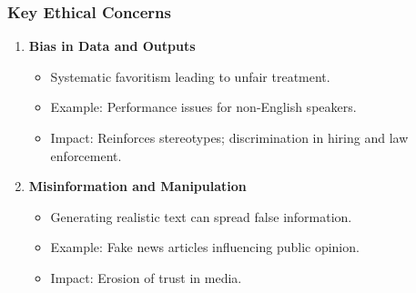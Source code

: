 \documentclass[aspectratio=169]{beamer}
\begin{document}
\begin{frame}[fragile]
    \frametitle{Key Ethical Concerns}
    \begin{enumerate}
        \item \textbf{Bias in Data and Outputs}
            \begin{itemize}
                \item Systematic favoritism leading to unfair treatment.
                \item Example: Performance issues for non-English speakers.
                \item Impact: Reinforces stereotypes; discrimination in hiring and law enforcement.
            \end{itemize}
            
        \item \textbf{Misinformation and Manipulation}
            \begin{itemize}
                \item Generating realistic text can spread false information.
                \item Example: Fake news articles influencing public opinion.
                \item Impact: Erosion of trust in media.
            \end{itemize}
    \end{enumerate}
\end{frame}
\end{document}
